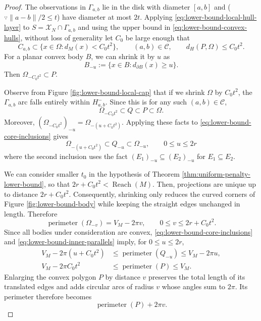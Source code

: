 \documentclass{article}
\newcommand{\Reach}{\operatorname{Reach}}
\numberwithin{equation}{section}
\newcommand{\Ccal}{\mathcal{C}}
\begin{document}
\begin{proof}
The observations in $\Gamma_{a,b}$ lie in the disk with diameter $[a,b]$
and ($\because \|a-b\|/2\leq t$) have diameter at most $2t$. Applying
\eqref{eq:lower-bound-local-hull-layer} to
$S=\mathcal X_N\cap\Gamma_{a,b}$ and using the upper bound in
\eqref{eq:lower-bound-convex-hulls}, without loss of generality let $C_0$
be large enough that
\[
 C_{a,b}\subset
 \{x\in\Omega:d_M(x)<C_0t^2\},
 \qquad (a,b)\in\mathcal C,
 \qquad d_H(P,\Omega)\le C_0t^2.
\]
For a planar convex body $B$, we can shrink it by $u$ as
\[
 B_{-u}:=\{x\in B:d_{\partial B}(x)\ge u\}.
\]
Then
$\Omega_{-C_0t^2}\subset P$. 

Observe from Figure \ref{fig:lower-bound-local-cap} that if we shrink $\Omega$ by $C_0t^2$, the $\Gamma_{a,b}$ arc falls entirely within $H_{a,b}^-$. Since this is for any such $(a,b)\in\Ccal$, 
\begin{equation}
 \Omega_{-C_0t^2}\subset Q\subset P\subset\Omega.
\label{eq:lower-bound-core-inclusions}
\end{equation}
Moreover,
$(\Omega_{-C_0t^2})_{-u}=\Omega_{-(u+C_0t^2)}$. Applying these facts to
\eqref{eq:lower-bound-core-inclusions} gives
\begin{equation}
 \Omega_{-(u+C_0t^2)}
 \subset Q_{-u}
 \subset\Omega_{-u},
\qquad 0\le u\le2r
\label{eq:lower-bound-inner-parallels}
\end{equation}
where the second inclusion uses the fact $(E_1)_{-u}\subseteq(E_2)_{-u}$ for  $E_1\subseteq E_2$.


We can consider smaller $t_0$ in the hypothesis of Theorem \ref{thm:uniform-penalty-lower-bound}, so that $2r+C_0t^2<\Reach(M)$. Then, projections are unique up to distance $2r+C_0t^2$. Consequently, shrinking only reduces the curved corners of Figure \ref{fig:lower-bound-body} while keeping the straight edges unchanged in length. Therefore 
\[
 \operatorname{perimeter}(\Omega_{-v})=V_M-2\pi v,
 \qquad 0\le v\le2r+C_0t^2.
\]
Since all bodies under consideration are convex, \eqref{eq:lower-bound-core-inclusions} and
\eqref{eq:lower-bound-inner-parallels} imply, for $0\le u\le2r$,
\begin{equation}
\begin{aligned}
 V_M-2\pi(u+C_0t^2)
 &\le\operatorname{perimeter}(Q_{-u})
 \le V_M-2\pi u,\\
 V_M-2\pi C_0t^2
 &\le\operatorname{perimeter}(P)\le V_M.
\end{aligned}
\label{eq:lower-bound-perimeter-bounds}
\end{equation}
Enlarging the convex polygon $P$ by distance $v$ preserves the total
length of its translated edges and adds circular arcs of radius $v$ whose
angles sum to $2\pi$. Its perimeter therefore becomes $$\operatorname{perimeter}(P)+2\pi v.$$


\end{proof}
\end{document}
